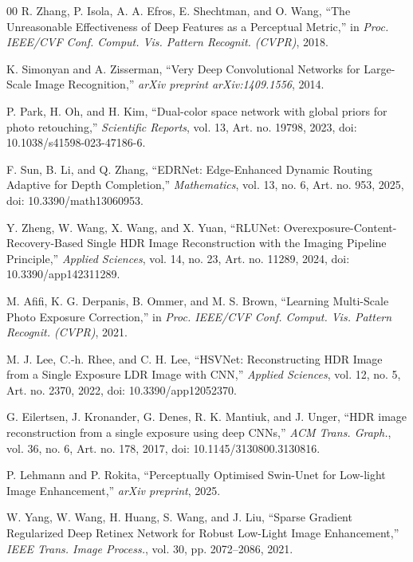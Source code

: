 \documentclass[conference]{IEEEtran}
\begin{document}
\begin{thebibliography}{00}
R. Zhang, P. Isola, A. A. Efros, E. Shechtman, and O. Wang, ``The Unreasonable Effectiveness of Deep Features as a Perceptual Metric,'' in \textit{Proc. IEEE/CVF Conf. Comput. Vis. Pattern Recognit. (CVPR)}, 2018.

K. Simonyan and A. Zisserman, ``Very Deep Convolutional Networks for Large-Scale Image Recognition,'' \textit{arXiv preprint arXiv:1409.1556}, 2014.

P. Park, H. Oh, and H. Kim, ``Dual-color space network with global priors for photo retouching,'' \textit{Scientific Reports}, vol. 13, Art. no. 19798, 2023, doi: 10.1038/s41598-023-47186-6.

F. Sun, B. Li, and Q. Zhang, ``EDRNet: Edge-Enhanced Dynamic Routing Adaptive for Depth Completion,'' \textit{Mathematics}, vol. 13, no. 6, Art. no. 953, 2025, doi: 10.3390/math13060953.

Y. Zheng, W. Wang, X. Wang, and X. Yuan, ``RLUNet: Overexposure-Content-Recovery-Based Single HDR Image Reconstruction with the Imaging Pipeline Principle,'' \textit{Applied Sciences}, vol. 14, no. 23, Art. no. 11289, 2024, doi: 10.3390/app142311289.

M. Afifi, K. G. Derpanis, B. Ommer, and M. S. Brown, ``Learning Multi-Scale Photo Exposure Correction,'' in \textit{Proc. IEEE/CVF Conf. Comput. Vis. Pattern Recognit. (CVPR)}, 2021. 

M. J. Lee, C.-h. Rhee, and C. H. Lee, ``HSVNet: Reconstructing HDR Image from a Single Exposure LDR Image with CNN,'' \textit{Applied Sciences}, vol. 12, no. 5, Art. no. 2370, 2022, doi: 10.3390/app12052370.

G. Eilertsen, J. Kronander, G. Denes, R. K. Mantiuk, and J. Unger, ``HDR image reconstruction from a single exposure using deep CNNs,'' \textit{ACM Trans. Graph.}, vol. 36, no. 6, Art. no. 178, 2017, doi: 10.1145/3130800.3130816.

P. Lehmann and P. Rokita, ``Perceptually Optimised Swin-Unet for Low-light Image Enhancement,'' \textit{arXiv preprint}, 2025.

W. Yang, W. Wang, H. Huang, S. Wang, and J. Liu, ``Sparse Gradient Regularized Deep Retinex Network for Robust Low-Light Image Enhancement,'' \textit{IEEE Trans. Image Process.}, vol. 30, pp. 2072--2086, 2021.

\end{thebibliography}
\end{document}
